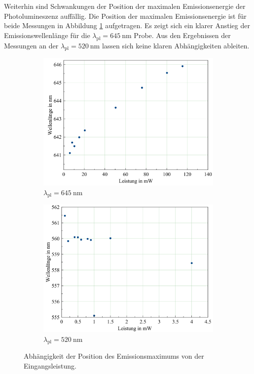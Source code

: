 Weiterhin sind Schwankungen der Position der maximalen Emissionsenergie der
Photolumineszenz auffällig. Die Position der maximalen Emissionsenergie ist für
beide Messungen in Abbildung \ref{fig:posem} aufgetragen. Es zeigt sich ein
klarer Anstieg der Emissionswellenlänge für die $\lambda_{\text{pl}}=\SI{645}{\nano\meter}$
Probe. Aus den Ergebnissen der Messungen an der $\lambda_{\text{pl}}=\SI{520}{\nano\meter}$
lassen sich keine klaren Abhängigkeiten ableiten.
\begin{figure}[H]
  \centering
  \begin{subfigure}{0.49\textwidth}
    \includegraphics[width=\textwidth]{plots/posemplot_645nm.png}
    \caption{$\lambda_{\text{pl}} = \SI{645}{\nano\meter}$}
  \end{subfigure}
  \begin{subfigure}{0.49\textwidth}
    \includegraphics[width=\textwidth]{plots/posemplot_520.png}
    \caption{$\lambda_{\text{pl}} = \SI{520}{\nano\meter}$}
  \end{subfigure}
  \caption{Abhängigkeit der Position des Emissionsmaximums von der Eingangsleistung.}
  \label{fig:posem}
\end{figure}

